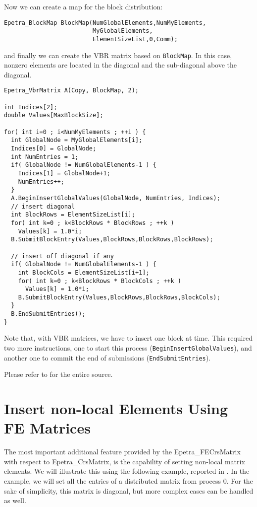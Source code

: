 Now we can create a map for the block distribution:
\begin{verbatim}
Epetra_BlockMap BlockMap(NumGlobalElements,NumMyElements,
                         MyGlobalElements, 
                         ElementSizeList,0,Comm);
\end{verbatim}
and finally we can create the VBR matrix based on \verb!BlockMap!. In
this case, nonzero elements are located in the diagonal and the
sub-diagonal above the diagonal.
\begin{verbatim}
Epetra_VbrMatrix A(Copy, BlockMap, 2);

int Indices[2];
double Values[MaxBlockSize];

for( int i=0 ; i<NumMyElements ; ++i ) {
  int GlobalNode = MyGlobalElements[i];
  Indices[0] = GlobalNode;
  int NumEntries = 1;
  if( GlobalNode != NumGlobalElements-1 ) {
    Indices[1] = GlobalNode+1;
    NumEntries++;
  }
  A.BeginInsertGlobalValues(GlobalNode, NumEntries, Indices);
  // insert diagonal
  int BlockRows = ElementSizeList[i];
  for( int k=0 ; k<BlockRows * BlockRows ; ++k )
    Values[k] = 1.0*i;
  B.SubmitBlockEntry(Values,BlockRows,BlockRows,BlockRows);

  // insert off diagonal if any
  if( GlobalNode != NumGlobalElements-1 ) {
    int BlockCols = ElementSizeList[i+1];
    for( int k=0 ; k<BlockRows * BlockCols ; ++k )
      Values[k] = 1.0*i;
    B.SubmitBlockEntry(Values,BlockRows,BlockRows,BlockCols);
  }
  B.EndSubmitEntries();
}
\end{verbatim}
Note that, with VBR matrices, we have to insert one block at time.  This
required two more instructions, one to start this process
(\verb!BeginInsertGlobalValues!), and another one to commit the end of
submissions (\verb!EndSubmitEntries!).
 
\smallskip

Please refer to  for the entire source.



\section{Insert non-local Elements Using FE Matrices}
\label{sec:fematrix}

The most important additional feature provided by the
Epetra\_FECrsMatrix with respect to Epetra\_CrsMatrix, is the capability
of setting non-local matrix elements. We will illustrate this using the
following example, reported in . In the example,
we will set all the entries of a distributed matrix from process 0. For
the sake of simplicity, this matrix is diagonal, but more complex cases
can be handled as well.

